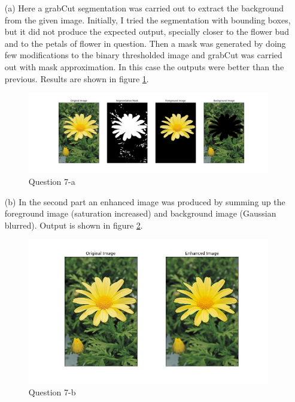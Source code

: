 \documentclass[11pt]{article}
\begin{document}
\begin{itemize}
    \item[(a)] Here a grabCut segmentation was carried out to extract the background from the given image. Initially, I tried 
    the segmentation with bounding boxes, but it did not produce the expected output, specially closer to the flower bud and to the petals of flower 
    in question. Then a mask was generated by doing few modifications to the binary thresholded image and grabCut was carried out with mask approximation. 
    In this case the outputs were better than the previous. Results are shown in figure \ref{71}. 
                
    \begin{figure}[!h]
        \centering
        \includegraphics[width=\textwidth]{Images/71.jpg}
        \caption{Question 7-a}
        \label{71}
    \end{figure}

    \item[(b)] In the second part an enhanced image was produced by summing up the foreground image (saturation increased) and background image 
    (Gaussian blurred). Output is shown in figure \ref{72}. 
    
    \begin{figure}[!h]
        \centering
        \includegraphics[width=\textwidth]{Images/72.jpg}
        \caption{Question 7-b}
        \label{72}
    \end{figure}
    

\end{itemize}
\end{document}
